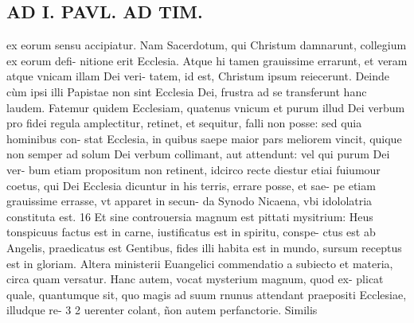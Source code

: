 \documentclass{article}
\begin{document}
\begin{pages}
\section*{AD I. PAVL. AD TIM. }
\marginpar{[ p.174 ]}\pstart ex eorum sensu accipiatur. Nam Sacerdotum, qui Christum damnarunt, collegium ex eorum defi- nitione erit Ecclesia. Atque hi tamen grauissime errarunt, et veram atque vnicam illam Dei veri- tatem, id est, Christum ipsum reiecerunt. Deinde cùm ipsi illi Papistae non sint Ecclesia Dei, frustra ad se transferunt hanc laudem. Fatemur quidem Ecclesiam, quatenus vnicum et purum illud Dei verbum pro fidei regula amplectitur, retinet, et sequitur, falli non posse: sed quia hominibus con- stat Ecclesia, in quibus saepe maior pars meliorem vincit, quique non semper ad solum Dei verbum collimant, aut attendunt: vel qui purum Dei ver- bum etiam propositum non retinent, idcirco recte diestur etiai fuiumour coetus, qui Dei Ecclesia dicuntur in his terris, errare posse, et sae- pe etiam grauissime errasse, vt apparet in secun- da Synodo Nicaena, vbi idololatria constituta est. 16 Et sine controuersia magnum est pittati mysitrium: Heus tonspicuus factus est in carne, iustificatus est in spiritu, conspe- ctus est ab Angelis, praedicatus est Gentibus, fides illi habita est in mundo, sursum receptus est in gloriam. Altera ministerii Euangelici commendatio a subiecto et materia, circa quam versatur. Hanc autem, vocat mysterium magnum, quod ex- plicat quale, quantumque sit, quo magis ad suum rnunus attendant praepositi Ecclesiae, illudque re- 3 2 uerenter colant, ñon autem perfanctorie. Similis  \pend
{}
{}
\subsection*{\textit{}}

\end{pages}
\end{document}
